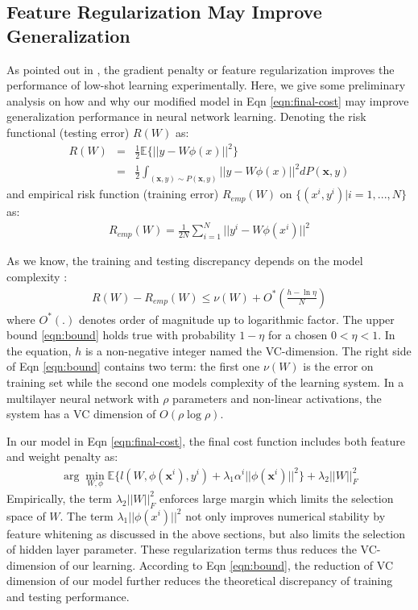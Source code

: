 {\color{red}\subsection{Feature Regularization May Improve Generalization}}
{\color{red}As pointed out in \cite{low-shot}, the gradient penalty or feature regularization improves the performance of low-shot learning experimentally. Here, we give some preliminary analysis on how and why our modified model in Eqn \ref{eqn:final-cost} may improve generalization performance in neural network learning. Denoting the risk functional (testing error) $R(W)$ as:
\begin{eqnarray*}
R(W)&=&\frac{1}{2}\mathbb{E}\{||y-W\phi(x)||^2\}\\
&=&\frac{1}{2}\int_{(\mathbf{x},y)\sim P(\mathbf{x},y)}||y-W\phi(x)||^2dP(\mathbf{x},y)
\end{eqnarray*}
and empirical risk function (training error) $R_{emp}(W)$ on $\{(x^i,y^i)|i=1,...,N\}$ as:
\begin{eqnarray*}
R_{emp}(W)=\frac{1}{2N}\sum_{i=1}^N||y^i-W\phi(x^i)||^2
\end{eqnarray*}

As we know, the training and testing discrepancy depends on the model complexity \cite{vc-dim}:
\begin{eqnarray}
R(W) - R_{emp}(W) \leq \nu(W)+O^*(\frac{h-\ln\eta}{N})%
\label{eqn:bound}
\end{eqnarray}
where $O^*(.)$ denotes order of magnitude up to logarithmic factor. The upper bound \ref{eqn:bound} holds true with probability $1-\eta$ for a chosen $0<\eta<1$. In the equation, $h$ is a non-negative integer named the VC-dimension. The right side of Eqn \ref{eqn:bound} contains two term: the first one $\nu(W)$ is the error on training set while the second one models complexity of the learning system. In a multilayer neural network with $\rho$ parameters and non-linear activations, the system has a VC dimension \cite{vc-dim-nn} of $O(\rho\log\rho)$.

In our model in Eqn \ref{eqn:final-cost}, the final cost function includes both feature and weight penalty as:
\begin{eqnarray*}
\arg\min_{W,\phi}\mathbb{E}\{l(W,\phi(\mathbf{x}^i),y^i)+\lambda_1\alpha^i||\phi(\mathbf{x}^i)||^2\}+\lambda_2||W||_F^2
\end{eqnarray*}
Empirically, the term $\lambda_2||W||_F^2$ enforces large margin which limits the selection space of $W$. The term $\lambda_1||\phi(x^i)||^2$ not only improves numerical stability by feature whitening as discussed in the above sections, but also limits the selection of hidden layer parameter. These regularization terms thus reduces the VC-dimension of our learning. According to Eqn \ref{eqn:bound}, the reduction of VC dimension of our model further reduces the theoretical discrepancy of training and testing performance.
}